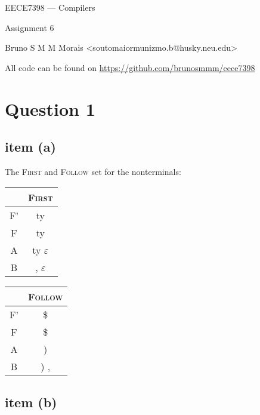 \documentclass[11pt]{article}
\begin{document}
\begin{center}
\huge EECE7398 --- Compilers

Assignment 6

\vskip1cm

\normalsize\ttfamily Bruno S M M Morais <soutomaiormunizmo.b@husky.neu.edu>

All code can be found on \url{https://github.com/brunosmmm/eece7398}

\end{center}

\vskip0.5cm

\section*{Question 1}
\subsection*{item (a)}

The \textsc{First} and \textsc{Follow} set for the nonterminals:

\begin{multicols}{2}

\begin{table}[H]
\centering
\begin{tabular}{c | c}
 & \textsc{First} \\
\hline
F' & ty \\
F  & ty \\
A  & ty $\varepsilon$  \\
B  & , $\varepsilon$  \\
\hline
\end{tabular}
\end{table}

\columnbreak

\begin{table}[H]
\centering
\begin{tabular}{c | c}
 & \textsc{Follow} \\
\hline
F' & \$ \\
F  & \$ \\
A  & ) \\
B  & ) , \\
\hline
\end{tabular}
\end{table}

\end{multicols}

\subsection*{item (b)}
\end{document}
